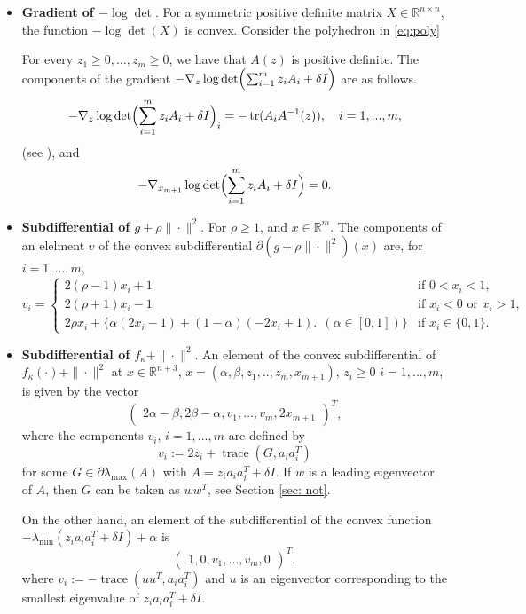 \documentclass[12pt]{amsart}
\theoremstyle{plain}
\theoremstyle{definition}
\begin{document}
\begin{itemize}
\item \textbf{Gradient of \(-\log\det\)}.
For a symmetric positive definite matrix \(X \in \mathbb{R}^{n \times n}\), the function \(-\log\det(X)\) is convex. Consider the polyhedron in \eqref{eq:poly}



For every \(z_1\ge 0, \dots, z_m\ge 0\), we have that $A(z)$ is positive definite. The components of the gradient $-\nabla_z \log\det\Bigl( \sum_{i=1}^m z_i A_i + \delta I \Bigr)$ are as follows.
\[
-\nabla_z \log\det\Bigl( \sum_{i=1}^m z_i A_i + \delta I \Bigr)_i = -\operatorname{tr}(A_i A^{-1}(z)), \quad i=1,...,m,
\]
(see \cite[Example A.3]{Joshi2009}), and
\[
-\nabla_{x_{m+1}} \log\det\Bigl( \sum_{i=1}^m z_i A_i + \delta I \Bigr) = 0.
\]


\item \textbf{Subdifferential of \(g + \rho \|\cdot\|^2\)}. 
For \(\rho \ge 1\), and $x\in \mathbb{R}^m$. The components of an elelment $v$ of the convex subdifferential $\partial (g + \rho \|\cdot\|^2)(x)$ are,
for $i=1,...,m$,
\begin{equation}
 v_i =
\begin{cases}  2(\rho-1)x_i + 1 & \text{if } 0 < x_i < 1, \\
2(\rho + 1)x_i - 1 & \text{if } x_i < 0 \text{ or } x_i > 1, \\
2\rho x_i + \bigl\{ 
 \alpha(2x_i-1) + (1-\alpha)(-2x_i+1) \bigr.\ \ (\alpha \in [0,1])\} & \text{if } x_i \in \{0,1\}.\end{cases}
\end{equation}





\item \textbf{Subdifferential of \(f_\kappa + \|\cdot\|^2\)}. An element of the convex subdifferential of \(f_\kappa(\cdot) + \|\cdot\|^2\) at \(x \in \mathbb{R}^{n+3}\), $x=(\alpha, \beta, z_1,..,z_m, x_{m+1})$, $z_i\ge0$ $i=1,...,m$, is given by the vector 
\begin{equation}
\begin{pmatrix}
2\alpha - \beta,
2\beta - \alpha,
v_1,
\dots,
v_m,
2x_{m+1}
\end{pmatrix}^T,
\end{equation}
where the components \(v_i\), \(i=1,...,m\) are defined by
\[
v_i := 2z_i + \operatorname{trace}(G, a_i a_i^T)
\]
for some \(G \in \partial \lambda_{\max}(A)\) with \(A = z_i a_i a_i^T + \delta I\). If \(w\) is a leading eigenvector of \(A\), then \(G\) can be taken as \(ww^T\), see Section \ref{sec: not}.

On the other hand, an element of the subdifferential of the convex function \(-\lambda_{\min}(z_i a_i a_i^T + \delta I) + \alpha\) is
\begin{equation}
\begin{pmatrix}
1 ,
0 ,
v_1 ,
\dots ,
v_m ,
0
\end{pmatrix}^T,
\end{equation}
where \(v_i := -\operatorname{trace}(u u^T, a_i a_i^T)\) and \(u\) is an eigenvector corresponding to the smallest eigenvalue of \(z_i a_i a_i^T + \delta I\).
\end{itemize}
\end{document}
